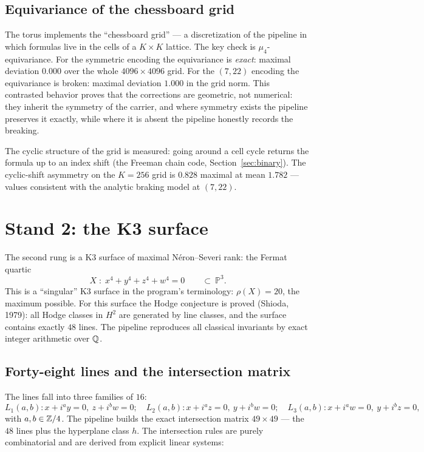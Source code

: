 \subsection{Equivariance of the chessboard grid}

The torus implements the ``chessboard grid'' --- a discretization of
the pipeline in which formulas live in the cells of a $K\times K$
lattice. The key check is $\mu_4$-equivariance. For the symmetric
encoding the equivariance is \emph{exact}: maximal deviation $0.000$
over the whole $4096\times4096$ grid. For the $(7,22)$ encoding the
equivariance is broken: maximal deviation $1.000$ in the grid norm.
This contrasted behavior proves that the corrections are geometric,
not numerical: they inherit the symmetry of the carrier, and where
symmetry exists the pipeline preserves it exactly, while where it is
absent the pipeline honestly records the breaking.

The cyclic structure of the grid is measured: going around a cell
cycle returns the formula up to an index shift (the Freeman chain
code, Section~\ref{sec:binary}). The cyclic-shift asymmetry on the
$K=256$ grid is $0.828$ maximal at mean $1.782$ --- values consistent
with the analytic braking model at $(7,22)$.

\section{Stand 2: the K3 surface}\label{sec:k3}

The second rung is a K3 surface of maximal N\'eron--Severi rank: the
Fermat quartic
\[
  X\;:\; x^4+y^4+z^4+w^4=0 \qquad \subset\ \mathbb{P}^3.
\]
This is a ``singular'' K3 surface in the program's terminology:
$\rho(X)=20$, the maximum possible. For this surface the Hodge
conjecture is proved (Shioda, 1979): all Hodge classes in $H^2$ are
generated by line classes, and the surface contains exactly $48$
lines. The pipeline reproduces all classical invariants by exact
integer arithmetic over $\mathbb{Q}$.

\subsection{Forty-eight lines and the intersection matrix}

The lines fall into three families of $16$:
\[
  L_1(a,b)\colon x+i^a y=0,\ z+i^b w=0; \quad
  L_2(a,b)\colon x+i^a z=0,\ y+i^b w=0; \quad
  L_3(a,b)\colon x+i^a w=0,\ y+i^b z=0,
\]
with $a,b\in\mathbb{Z}/4$. The pipeline builds the exact intersection
matrix $49\times49$ --- the $48$ lines plus the hyperplane class
$h$. The intersection rules are purely combinatorial and are derived
from explicit linear systems:

